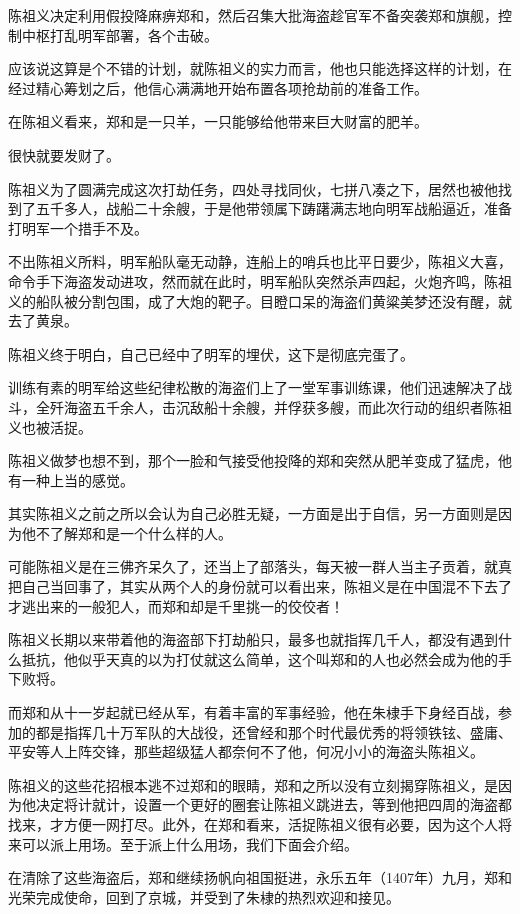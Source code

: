 \begin{multicols}{\theparacolNo}
陈祖义决定利用假投降麻痹郑和，然后召集大批海盗趁官军不备突袭郑和旗舰，控制中枢打乱明军部署，各个击破。

应该说这算是个不错的计划，就陈祖义的实力而言，他也只能选择这样的计划，在经过精心筹划之后，他信心满满地开始布置各项抢劫前的准备工作。

在陈祖义看来，郑和是一只羊，一只能够给他带来巨大财富的肥羊。

很快就要发财了。

陈祖义为了圆满完成这次打劫任务，四处寻找同伙，七拼八凑之下，居然也被他找到了五千多人，战船二十余艘，于是他带领属下踌躇满志地向明军战船逼近，准备打明军一个措手不及。

不出陈祖义所料，明军船队毫无动静，连船上的哨兵也比平日要少，陈祖义大喜，命令手下海盗发动进攻，然而就在此时，明军船队突然杀声四起，火炮齐鸣，陈祖义的船队被分割包围，成了大炮的靶子。目瞪口呆的海盗们黄粱美梦还没有醒，就去了黄泉。

陈祖义终于明白，自己已经中了明军的埋伏，这下是彻底完蛋了。

训练有素的明军给这些纪律松散的海盗们上了一堂军事训练课，他们迅速解决了战斗，全歼海盗五千余人，击沉敌船十余艘，并俘获多艘，而此次行动的组织者陈祖义也被活捉。

陈祖义做梦也想不到，那个一脸和气接受他投降的郑和突然从肥羊变成了猛虎，他有一种上当的感觉。

其实陈祖义之前之所以会认为自己必胜无疑，一方面是出于自信，另一方面则是因为他不了解郑和是一个什么样的人。

可能陈祖义是在三佛齐呆久了，还当上了部落头，每天被一群人当主子贡着，就真把自己当回事了，其实从两个人的身份就可以看出来，陈祖义是在中国混不下去了才逃出来的一般犯人，而郑和却是千里挑一的佼佼者！

陈祖义长期以来带着他的海盗部下打劫船只，最多也就指挥几千人，都没有遇到什么抵抗，他似乎天真的以为打仗就这么简单，这个叫郑和的人也必然会成为他的手下败将。

而郑和从十一岁起就已经从军，有着丰富的军事经验，他在朱棣手下身经百战，参加的都是指挥几十万军队的大战役，还曾经和那个时代最优秀的将领铁铉、盛庸、平安等人上阵交锋，那些超级猛人都奈何不了他，何况小小的海盗头陈祖义。

陈祖义的这些花招根本逃不过郑和的眼睛，郑和之所以没有立刻揭穿陈祖义，是因为他决定将计就计，设置一个更好的圈套让陈祖义跳进去，等到他把四周的海盗都找来，才方便一网打尽。此外，在郑和看来，活捉陈祖义很有必要，因为这个人将来可以派上用场。至于派上什么用场，我们下面会介绍。

在清除了这些海盗后，郑和继续扬帆向祖国挺进，永乐五年（1407年）九月，郑和光荣完成使命，回到了京城，并受到了朱棣的热烈欢迎和接见。


\end{multicols}
